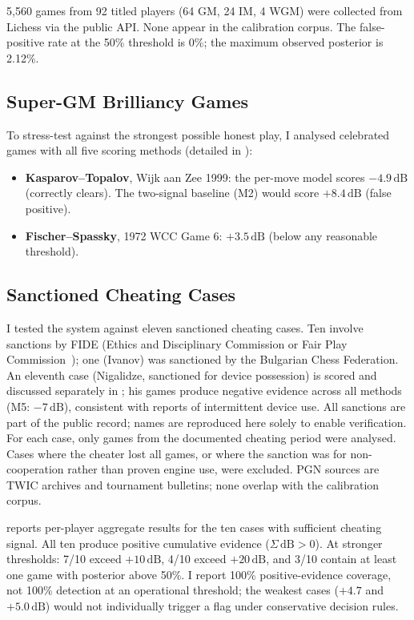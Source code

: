 \documentclass[11pt,a4paper]{article}
\newcommand{\dB}{\,\mathrm{dB}}
\theoremstyle{definition}
\begin{document}
5{,}560 games from 92 titled players (64 GM, 24 IM, 4 WGM) were
collected from Lichess via the public API.  None appear in the
calibration corpus.  The false-positive rate at the 50\% threshold is
0\%; the maximum observed posterior is 2.12\%.

\subsection{Super-GM Brilliancy Games}
\label{sec:brilliancy}

To stress-test against the strongest possible honest play, I analysed
celebrated games with all five scoring methods (detailed in
):

\begin{itemize}[nosep]
  \item \textbf{Kasparov--Topalov}, Wijk aan Zee 1999: the per-move
    model scores $-4.9\dB$ (correctly clears).  The two-signal baseline (M2)
    would score $+8.4\dB$ (false positive).
  \item \textbf{Fischer--Spassky}, 1972 WCC Game 6: $+3.5\dB$
    (below any reasonable threshold).
\end{itemize}

\subsection{Sanctioned Cheating Cases}
\label{sec:cases}

I tested the system against eleven sanctioned cheating cases.
Ten involve sanctions by FIDE (Ethics and Disciplinary Commission or
Fair Play Commission~\citep{fide2024fairplay}); one (Ivanov) was
sanctioned by the Bulgarian Chess Federation.  An eleventh case
(Nigalidze, sanctioned for device possession) is scored and discussed
separately in ; his games produce negative
evidence across all methods (M5: $-7\dB$), consistent with reports of
intermittent device use.  All sanctions are part of the public record;
names are reproduced here solely to enable verification.  For each
case, only games from the documented cheating period were analysed.
Cases where the cheater lost all games, or where the sanction was for
non-cooperation rather than proven engine use, were excluded.  PGN
sources are TWIC archives and tournament bulletins; none overlap with
the calibration corpus.

 reports per-player aggregate results for the ten
cases with sufficient cheating signal.  All ten produce positive
cumulative evidence ($\Sigma\dB > 0$).  At stronger
thresholds: 7/10 exceed $+10\dB$, 4/10 exceed $+20\dB$, and 3/10
contain at least one game with posterior above 50\%.  I report
100\% positive-evidence coverage, not 100\% detection at an
operational threshold; the weakest cases ($+4.7$ and $+5.0\dB$)
would not individually trigger a flag under conservative decision
rules.
\end{document}
